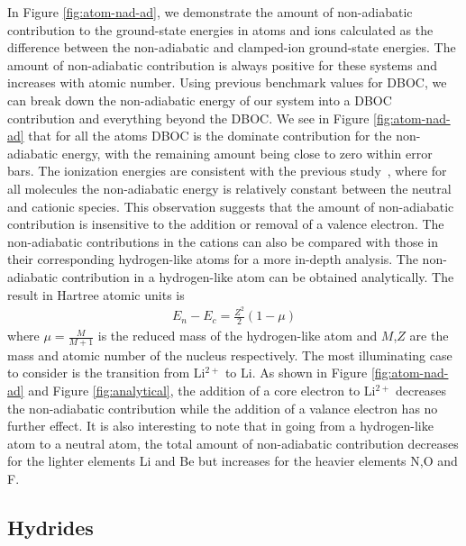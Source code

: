 \documentclass[pra,superscriptaddress,groupedaddress,twocolumn]{revtex4}
\begin{document}
In Figure \ref{fig:atom-nad-ad}, we demonstrate the amount of non-adiabatic contribution to the ground-state energies in atoms and ions calculated as the difference between the non-adiabatic and clamped-ion ground-state energies. The amount of non-adiabatic contribution is always positive for these systems and increases with atomic number. Using previous benchmark values for DBOC, we can break down the non-adiabatic energy of our system into a DBOC contribution and everything beyond the DBOC. We see in Figure \ref{fig:atom-nad-ad} that for all the atoms DBOC is the dominate contribution for the non-adiabatic energy, with the remaining amount being close to zero within error bars. The ionization energies are consistent with the previous study~\cite{Klopper_IP}, where for all molecules the non-adiabatic energy is relatively constant between the neutral and cationic species. This observation suggests that the amount of non-adiabatic contribution is insensitive to the addition or removal of a valence electron. The non-adiabatic contributions in the cations can also be compared with those in their corresponding hydrogen-like atoms for a more in-depth analysis. The non-adiabatic contribution in a hydrogen-like atom can be obtained analytically. The result in Hartree atomic units is
\begin{align}
E_n-E_c=\frac{Z^2}{2}(1-\mu)
\end{align}
where $\mu=\frac{M}{M+1}$ is the reduced mass of the hydrogen-like atom and $M$,$Z$ are the mass and atomic number of the nucleus respectively. The most illuminating case to consider is the transition from Li$^{2+}$ to Li. As shown in Figure \ref{fig:atom-nad-ad} and Figure \ref{fig:analytical}, the addition of a core electron to Li$^{2+}$ decreases the non-adiabatic contribution while the addition of a valance electron has no further effect. It is also interesting to note that in going from a hydrogen-like atom to a neutral atom, the total amount of non-adiabatic contribution decreases for the lighter elements Li and Be but increases for the heavier elements N,O and F.


\subsection{Hydrides}
\end{document}
